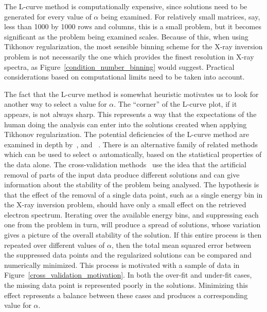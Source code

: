 The L-curve method is computationally expensive, since solutions need to be generated for every value of $\alpha$ being examined. For relatively small matrices, say, less than 1000 by 1000 rows and columns, this is a small problem, but it becomes significant as the problem being examined scales. Because of this, when using Tikhonov regularization, the most sensible binning scheme for the X-ray inversion problem is not necessarily the one which provides the finest resolution in X-ray spectra, as Figure~\ref{condition_number_binning} would suggest. Practical considerations based on computational limits need to be taken into account. 

The fact that the L-curve method is somewhat heuristic motivates us to look for another way to select a value for $\alpha$. The ``corner'' of the L-curve plot, if it appears, is not always sharp. This represents a way that the expectations of the human doing the analysis can enter into the solutions created when applying Tikhonov regularization. The potential deficiencies of the L-curve method are examined in depth by~\citet{Hanke1996,Hansen1993}, and ~\citet{Vogel1996}. There is an alternative family of related methods which can be used to select $\alpha$ automatically, based on the statistical properties of the data alone. The cross-validation methods~\citep{Golub1979, Aster2005} use the idea that the artificial removal of parts of the input data produce different solutions and can give information about the stability of the problem being analysed. The hypothesis is that the effect of the removal of a single data point, such as a single energy bin in the X-ray inversion problem, should have only a small effect on the retrieved electron spectrum. Iterating over the available energy bins, and suppressing each one from the problem in turn, will produce a spread of solutions, whose variation gives a picture of the overall stability of the solution. If this entire process is then repeated over different values of $\alpha$, then the total mean squared error between the suppressed data points and the regularized solutions can be compared and numerically minimized. This process is motivated with a sample of data in Figure~\ref{cross_validation_motivation}. In both the over-fit and under-fit cases, the missing data point is represented poorly in the solutions. Minimizing this effect represents a balance between these cases and produces a corresponding value for $\alpha$. 

